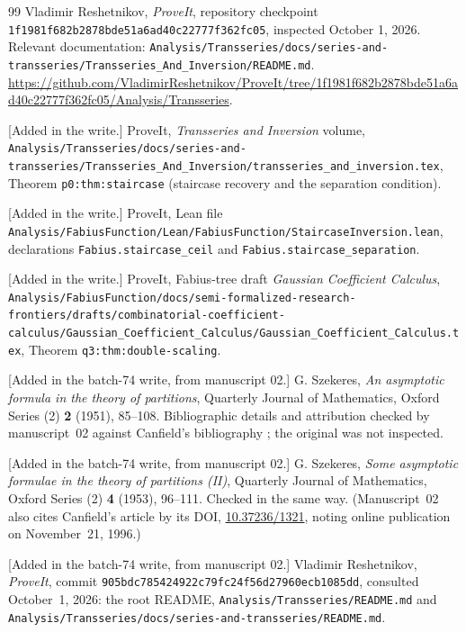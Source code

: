\documentclass[11pt,a4paper]{article}
\numberwithin{equation}{section}
\theoremstyle{definition}
\theoremstyle{remark}
\begin{document}
\begin{thebibliography}{99}
Vladimir Reshetnikov, \emph{ProveIt}, repository checkpoint
\nolinkurl{1f1981f682b2878bde51a6ad40c22777f362fc05}, inspected October 1, 2026.
Relevant documentation: \nolinkurl{Analysis/Transseries/docs/series-and-transseries/Transseries_And_Inversion/README.md}.
\url{https://github.com/VladimirReshetnikov/ProveIt/tree/1f1981f682b2878bde51a6ad40c22777f362fc05/Analysis/Transseries}.

[Added in the write.] ProveIt, \emph{Transseries and Inversion} volume,
\nolinkurl{Analysis/Transseries/docs/series-and-transseries/Transseries_And_Inversion/transseries_and_inversion.tex},
Theorem \texttt{p0:thm:staircase} (staircase recovery and the separation
condition).

[Added in the write.] ProveIt, Lean file
\nolinkurl{Analysis/FabiusFunction/Lean/FabiusFunction/StaircaseInversion.lean},
declarations \texttt{Fabius.staircase\_ceil} and
\texttt{Fabius.staircase\_separation}.

[Added in the write.] ProveIt, Fabius-tree draft \emph{Gaussian
Coefficient Calculus},
\nolinkurl{Analysis/FabiusFunction/docs/semi-formalized-research-frontiers/drafts/combinatorial-coefficient-calculus/Gaussian_Coefficient_Calculus/Gaussian_Coefficient_Calculus.tex},
Theorem \texttt{q3:thm:double-scaling}.

[Added in the batch-74 write, from manuscript 02.] G. Szekeres, \emph{An
asymptotic formula in the theory of partitions}, Quarterly Journal of
Mathematics, Oxford Series (2) \textbf{2} (1951), 85--108. Bibliographic
details and attribution checked by manuscript~02 against Canfield's
bibliography \cite{canfield}; the original was not inspected.

[Added in the batch-74 write, from manuscript 02.] G. Szekeres, \emph{Some
asymptotic formulae in the theory of partitions (II)}, Quarterly Journal of
Mathematics, Oxford Series (2) \textbf{4} (1953), 96--111. Checked in the
same way. (Manuscript~02 also cites Canfield's article by its DOI,
\href{https://doi.org/10.37236/1321}{10.37236/1321}, noting online
publication on November~21, 1996.)

[Added in the batch-74 write, from manuscript 02.] Vladimir Reshetnikov,
\emph{ProveIt}, commit
\nolinkurl{905bdc785424922c79fc24f56d27960ecb1085dd}, consulted October~1,
2026: the root README, \nolinkurl{Analysis/Transseries/README.md} and
\nolinkurl{Analysis/Transseries/docs/series-and-transseries/README.md}.
\end{thebibliography}
\endgroup
\end{document}
